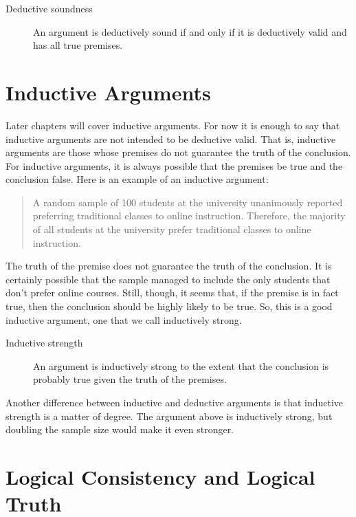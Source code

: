 \documentclass[../logic-text.tex]{subfiles}
\begin{document}
\begin{description}
  \item[Deductive soundness] An argument is deductively sound if and only if it is deductively valid and has all true premises.  
\end{description}


\section{Inductive Arguments}
\label{sec:inductive-arguments}

Later chapters will cover inductive arguments. For now it is enough to say that inductive arguments are not intended to be deductive valid. That is, inductive arguments are those whose premises do not guarantee the truth of the conclusion. For inductive arguments, it is always possible that the premises be true and the conclusion false. Here is an example of an inductive argument:

\begin{quote}
A random sample of 100 students at the university unanimously reported preferring traditional classes to online instruction. Therefore, the majority of all students at the university prefer traditional classes to online instruction.
\end{quote}

The truth of the premise does not guarantee the truth of the conclusion. It is certainly possible that the sample managed to include the only students that don't prefer online courses. Still, though, it seems that, if the premise is in fact true, then the conclusion should be highly likely to be true. So, this is a good inductive argument, one that we call inductively strong.

\begin{description}
  \item[Inductive strength] An argument is inductively strong to the extent that the conclusion is probably true given the truth of the premises.
\end{description}

Another difference between inductive and deductive arguments is that inductive strength is a matter of degree. The argument above is inductively strong, but doubling the sample size would make it even stronger.


\section{Logical Consistency and Logical Truth}
\label{sec:logic-cons-truth}
\end{document}
